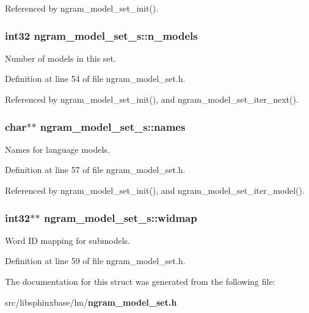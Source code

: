 Referenced by ngram\_\-model\_\-set\_\-init().
\subsubsection[{n\_\-models}]{\setlength{\rightskip}{0pt plus 5cm}int32 {\bf ngram\_\-model\_\-set\_\-s::n\_\-models}}\label{structngram__model__set__s_6c28858d5631a9c9dbc7b2c9583f5c5a}


Number of models in this set. 



Definition at line 54 of file ngram\_\-model\_\-set.h.

Referenced by ngram\_\-model\_\-set\_\-init(), and ngram\_\-model\_\-set\_\-iter\_\-next().
\subsubsection[{names}]{\setlength{\rightskip}{0pt plus 5cm}char$\ast$$\ast$ {\bf ngram\_\-model\_\-set\_\-s::names}}\label{structngram__model__set__s_ff5e13c45decde4c5bf30d8aa2b1c7d9}


Names for language models. 



Definition at line 57 of file ngram\_\-model\_\-set.h.

Referenced by ngram\_\-model\_\-set\_\-init(), and ngram\_\-model\_\-set\_\-iter\_\-model().
\subsubsection[{widmap}]{\setlength{\rightskip}{0pt plus 5cm}int32$\ast$$\ast$ {\bf ngram\_\-model\_\-set\_\-s::widmap}}\label{structngram__model__set__s_ddebde44e2b7aa22dd82032c316fc962}


Word ID mapping for submodels. 



Definition at line 59 of file ngram\_\-model\_\-set.h.

The documentation for this struct was generated from the following file:\begin{CompactItemize}
\item 
src/libsphinxbase/lm/{\bf ngram\_\-model\_\-set.h}\end{CompactItemize}
